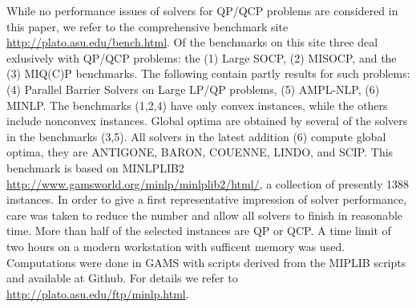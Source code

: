While no performance issues of solvers for QP/QCP problems are considered in 
this paper, we refer to the comprehensive benchmark site \url{http://plato.asu.edu/bench.html}. Of the benchmarks
on this site three deal exlusively with QP/QCP problems: 
the (1) Large SOCP, (2) MISOCP, and the (3) MIQ(C)P benchmarks. 
The following contain partly results for such problems: 
(4) Parallel Barrier Solvers on Large LP/QP problems, (5) AMPL-NLP, (6) MINLP.
The benchmarks (1,2,4) have only convex instances, while the others include 
nonconvex instances. Global optima are obtained by several of the solvers in
the benchmarks (3,5).
All solvers in the latest addition (6) compute global optima, they are ANTIGONE,
BARON, COUENNE, LINDO, and SCIP. This benchmark is based on MINLPLIB2 \url{http://www.gamsworld.org/minlp/minlplib2/html/}, a
collection of presently 1388 instances. In order to give a first representative
impression of solver performance, care was taken to reduce the number and 
allow all solvers to finish in reasonable time. More than half of the selected
instances are QP or QCP. A time limit of two hours on a
modern workstation with sufficent memory was used. Computations were done in
GAMS with scripts derived from the MIPLIB scripts and available at Github.
For details we refer to \url{http://plato.asu.edu/ftp/minlp.html}.

